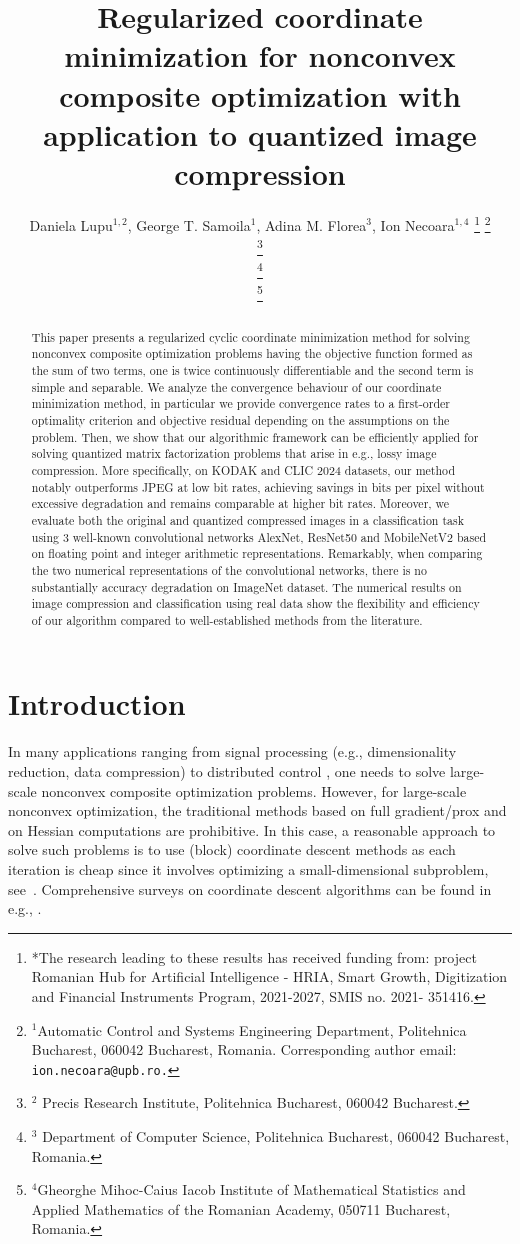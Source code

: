 \documentclass[lettersize,journal]{IEEEtran}
\title{Regularized coordinate minimization for nonconvex composite optimization with application to quantized image compression}
\author{Daniela Lupu$^{1,2}$, George  T. Samoila$^{1}$,  Adina M. Florea$^{3}$, Ion Necoara$^{1,4}$
\thanks{*The research leading to these results has received funding from:  project Romanian Hub for Artificial Intelligence - HRIA, Smart Growth, Digitization and Financial Instruments Program, 2021-2027, SMIS no. 2021- 351416.}
\thanks{$^{1}$Automatic Control and Systems Engineering Department, Politehnica  Bucharest, 060042 Bucharest, Romania. Corresponding author email: {\tt\small  ion.necoara@upb.ro.}}%
	
\thanks{$^{2}$ Precis Research Institute, Politehnica  Bucharest, 060042 Bucharest. }

\thanks{$^{3}$  Department of Computer Science,  Politehnica  Bucharest, 060042 Bucharest, Romania. }
    
\thanks{$^{4}$Gheorghe Mihoc-Caius Iacob Institute of Mathematical Statistics and Applied Mathematics of the Romanian Academy, 050711 Bucharest, Romania.}
}
\begin{document}
\maketitle

\begin{abstract} This paper presents  a regularized cyclic coordinate minimization method for solving  nonconvex composite  optimization problems having  the  objective function formed as the sum of two  terms, one is twice continuously differentiable  and the second  term is simple and  separable.  We analyze the  convergence  behaviour of  our  coordinate minimization  method, in particular we provide convergence rates to a first-order optimality criterion and objective residual  depending on the assumptions on the problem. Then, we show that our algorithmic framework can be efficiently applied for solving quantized matrix factorization problems that arise in e.g.,  lossy image compression. More specifically, on KODAK and  CLIC 2024 datasets,  our method notably outperforms JPEG at low bit rates, achieving savings in bits per pixel without excessive degradation and remains comparable at higher bit rates. Moreover, we evaluate both  the original and  quantized compressed images in a classification task using 3 well-known convolutional networks AlexNet, ResNet50 and MobileNetV2 based on floating point and integer arithmetic representations. Remarkably, when comparing the two numerical representations of the convolutional networks, there is no substantially accuracy degradation on  ImageNet dataset. The numerical results on image compression and classification using real data show the flexibility and  efficiency of our  algorithm compared to well-established methods from the literature. 
\end{abstract}


\section{Introduction}
\noindent In many applications ranging from signal processing  (e.g., dimensionality reduction, data compression) \cite{Hou:15} to distributed control  \cite{NecCli:13}, one needs to solve  large-scale nonconvex composite optimization problems. However, for large-scale nonconvex  optimization,  the traditional methods based on full gradient/prox  and on Hessian  computations are prohibitive. In this case, a reasonable approach to solve such problems  is to use  (block) coordinate descent methods as each iteration is cheap since it involves optimizing a small-dimensional subproblem, see~\cite{Ber:99}. Comprehensive  surveys on coordinate descent algorithms can be found in e.g., \cite{Nec-cd17,wright2015coordinate}.
\end{document}
